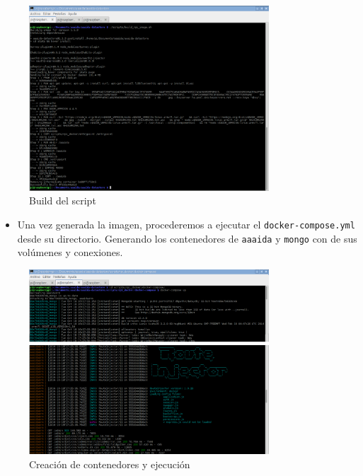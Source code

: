 \begin{figure}[htb]
\begin{center}
\includegraphics[width=0.8\textwidth]{./setup/buildScript}
\caption{Build del script}
\end{center}
\end{figure}

\begin{itemize}
\item Una vez generada la imagen, procederemos a ejecutar el \texttt{docker-compose.yml} desde su directorio. Generando los contenedores de \texttt{aaaida} y \texttt{mongo} con de sus volúmenes y conexiones.  
\end{itemize}
\pagebreak

\begin{figure}[htb]
\begin{center}
\includegraphics[width=0.8\textwidth]{./setup/Up2}
\caption{Creación de contenedores y ejecución}
\end{center}
\end{figure}

